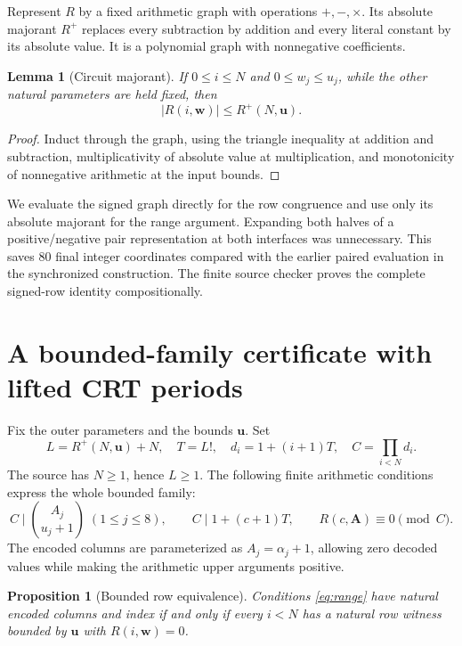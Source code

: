 \documentclass[11pt]{article}
\newtheorem{lemma}[theorem]{Lemma}
\newtheorem{proposition}[theorem]{Proposition}
\theoremstyle{definition}
\theoremstyle{remark}
\begin{document}
Represent $R$ by a fixed arithmetic graph with operations $+,-,\times$.
Its absolute majorant $R^+$ replaces every subtraction by addition and
every literal constant by its absolute value. It is a polynomial graph
with nonnegative coefficients.

\begin{lemma}[Circuit majorant]
If $0\le i\le N$ and $0\le w_j\le u_j$, while the other natural
parameters are held fixed, then
\[
 |R(i,\mathbf w)|\le R^+(N,\mathbf u).
\]
\end{lemma}
\begin{proof}
Induct through the graph, using the triangle inequality at addition and
subtraction, multiplicativity of absolute value at multiplication, and
monotonicity of nonnegative arithmetic at the input bounds.
\end{proof}

We evaluate the signed graph directly for the row congruence and use
only its absolute majorant for the range argument. Expanding both halves
of a positive/negative pair representation at both interfaces was
unnecessary. This saves 80 final integer coordinates compared with the
earlier paired evaluation in the synchronized construction. The finite
source checker proves the complete signed-row identity compositionally.

\section{A bounded-family certificate with lifted CRT periods}\label{sec:crt}

Fix the outer parameters and the bounds $\mathbf u$. Set
\[
 L=R^+(N,\mathbf u)+N,\quad T=L!,\quad
 d_i=1+(i+1)T,\quad C=\prod_{i<N}d_i.
\]
The source has $N\ge1$, hence $L\ge1$. The following finite arithmetic
conditions express the whole bounded family:
\begin{equation}\label{eq:range}
 C\mid\binom{A_j}{u_j+1}\;(1\le j\le8),\qquad
 C\mid1+(c+1)T,\qquad R(c,\mathbf A)\equiv0\pmod C.
\end{equation}
The encoded columns are parameterized as $A_j=\alpha_j+1$, allowing
zero decoded values while making the arithmetic upper arguments positive.

\begin{proposition}[Bounded row equivalence]
Conditions \eqref{eq:range} have natural encoded columns and index if
and only if every $i<N$ has a natural row witness bounded by
$\mathbf u$ with $R(i,\mathbf w)=0$.
\end{proposition}
\end{document}
